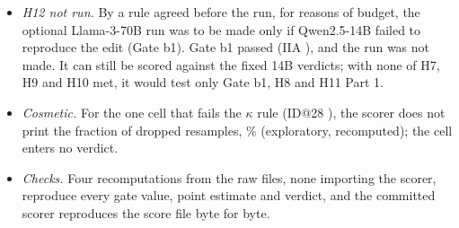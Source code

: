 \begin{itemize}
  \item \emph{H12 not run.} By a rule agreed before the run, for reasons of budget, the optional Llama-3-70B run was to be made only if Qwen2.5-14B failed to reproduce the edit (Gate b1). Gate b1 passed (IIA \PkGatebOneBind{}), and the run was not made. It can still be scored against the fixed 14B verdicts; with none of H7, H9 and H10 met, it would test only Gate b1, H8 and H11 Part 1.
  \item \emph{Cosmetic.} For the one cell that fails the $\kappa$ rule (ID@28 \fmtLetter{}), the scorer does not print the fraction of dropped resamples, \PkDropIdTwentyeightLetter{}\% (exploratory, recomputed); the cell enters no verdict.
  \item \emph{Checks.} Four recomputations from the raw files, none importing the scorer, reproduce every gate value, point estimate and verdict, and the committed scorer reproduces the score file byte for byte.
\end{itemize}

